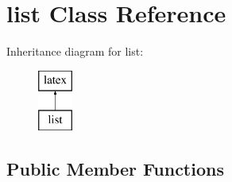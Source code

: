 \hypertarget{classlist}{\section{list Class Reference}
\label{classlist}
}
Inheritance diagram for list\-:\begin{figure}[H]
\begin{center}
\leavevmode
\includegraphics[height=2.000000cm]{classlist}
\end{center}
\end{figure}
\subsection*{Public Member Functions}
